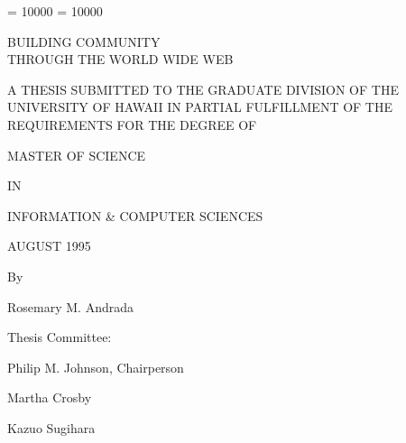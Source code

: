 
\clubpenalty = 10000    
\widowpenalty = 10000
\sloppy
\thispagestyle{empty}

\par\vspace*{0.00in}

\begin{center}
  BUILDING COMMUNITY \\

  THROUGH THE WORLD WIDE WEB 
\end{center}

\vspace*{0.6in}

  \begin{center}  
  A THESIS SUBMITTED TO THE GRADUATE DIVISION OF THE\\
  
  UNIVERSITY OF HAWAII IN PARTIAL FULFILLMENT OF THE\\
  
  REQUIREMENTS FOR THE DEGREE OF 
\end{center}

\begin{center}

  MASTER OF SCIENCE

 IN

 INFORMATION \& COMPUTER SCIENCES

 AUGUST 1995


\vspace*{0.7in}
 
  By   
  
  \vspace{.2in}
  
  Rosemary M. Andrada

  \vspace{0.2in}
\end{center}  

\begin{center}
  Thesis Committee:
  \vspace{0.2in}

  Philip M. Johnson, Chairperson

  Martha Crosby

  Kazuo Sugihara

\end{center}  
